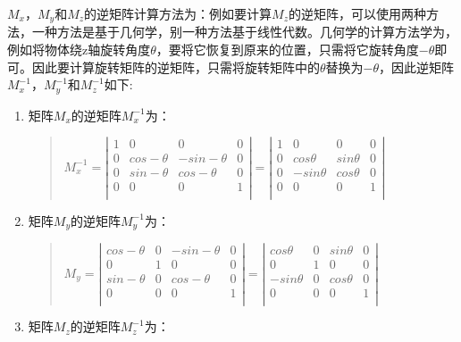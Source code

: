 \documentclass[a4paper,10pt]{article}
\begin{document}
\begin{CJK}{UTF8}{song}
$M_{x}$，$M_{y}$和$M_{z}$的逆矩阵计算方法为：例如要计算$M_{z}$的逆矩阵，可以使用两种方法，一种方法是基于几何学，别一种方法基于线性代数。几何学的计算方法学为，例如将物体绕z轴旋转角度$\theta$，要将它恢复到原来的位置，只需将它旋转角度$-\theta$即可。因此要计算旋转矩阵的逆矩阵，只需将旋转矩阵中的$\theta$替换为$-\theta$，因此逆矩阵$M_{x}^{-1}$，$M_{y}^{-1}$和$M_{z}^{-1}$如下:
\begin{enumerate}
\item 矩阵$M_{x}$的逆矩阵$M_{x}^{-1}$为：
\begin{quote}
\begin{math}
M_{x}^{-1}=\left|
\begin{array}{cccc}
1 & 0 & 0 & 0 \\
0 & cos-\theta & -sin-\theta & 0 \\
0 & sin-\theta & cos-\theta & 0 \\
0 & 0 & 0 & 1 \\
\end{array}
\right|
=\left|
\begin{array}{cccc}
1 & 0 & 0 & 0 \\
0 & cos\theta & sin\theta & 0 \\
0 & -sin\theta & cos\theta & 0 \\
0 & 0 & 0 & 1 \\
\end{array}
\right|
\end{math}
\end{quote}
\item 矩阵$M_{y}$的逆矩阵$M_{y}^{-1}$为：
\begin{quote}
\begin{math}
M_{y}=\left|
\begin{array}{cccc}
cos-\theta & 0 & -sin-\theta & 0  \\
0 & 1 & 0 & 0 \\
sin-\theta & 0 & cos-\theta & 0 \\
0 & 0 & 0 & 1 \\
\end{array}
\right| 
=\left|
\begin{array}{cccc}
cos\theta & 0 & sin\theta & 0  \\
0 & 1 & 0 & 0 \\
-sin\theta & 0 & cos\theta & 0 \\
0 & 0 & 0 & 1 \\
\end{array}
\right| 
\end{math}
\end{quote}
\item 矩阵$M_{z}$的逆矩阵$M_{z}^{-1}$为：

\end{enumerate}
\end{CJK}
\end{document}
